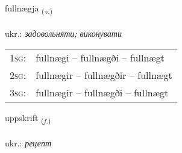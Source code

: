 \documentclass[frontgrid, backgrid]{flacards}\usepackage[]{graphicx}\usepackage[]{xcolor}
\begin{document}
\renewcommand{\flhead}{\vskip5pt \fboxsep=0pt {\small\bfseries\footnotesize Sagnorð | дієслово}}
\renewcommand{\fcfoot}{\vskip5pt \fboxsep=0pt \hspace{2pt}{\small\bfseries\footnotesize 3K}}

\renewcommand{\blhead}{\vskip5pt {\small\bfseries\footnotesize Sagnorð | дієслово }}
\renewcommand{\bcfoot}{\vskip5pt \hspace{2pt}{\small\bfseries\footnotesize 3K}}


{fullnægja \small{\textsubscript{(\textit{v.})}} \\[1ex] %
\textphonetic{[fʏtlnaija]} \\
ukr.: \emph{задовольняти; виконувати} \\  [2ex]
\renewcommand*{\arraystretch}{0.8}
\begin{tabular}{p{1cm}l}
\textsc{1sg}: & fullnægi -- fullnægði -- fullnægt \\ 
\textsc{2sg}: & fullnægir -- fullnægðir -- fullnægt \\ 
\textsc{3sg}: & fullnægir -- fullnægði -- fullnægt \\ 
\end{tabular}
}

\renewcommand{\flhead}{\vskip5pt \fboxsep=0pt {\small\bfseries\footnotesize Nafnorð | іменник}}
\renewcommand{\fcfoot}{\vskip5pt \fboxsep=0pt \hspace{2pt}{\small\bfseries\footnotesize 3K}}

\renewcommand{\blhead}{\vskip5pt {\small\bfseries\footnotesize Nafnorð | іменник }}
\renewcommand{\bcfoot}{\vskip5pt \hspace{2pt}{\small\bfseries\footnotesize 3K}}


{uppskrift \small{\textsubscript{(\textit{f.})}} \\[1ex] %
\textphonetic{[ʏhpskrɪft]} \\
ukr.: \emph{рецепт} \\  [2ex]
\renewcommand*{\arraystretch}{0.8}
}
\end{document}
